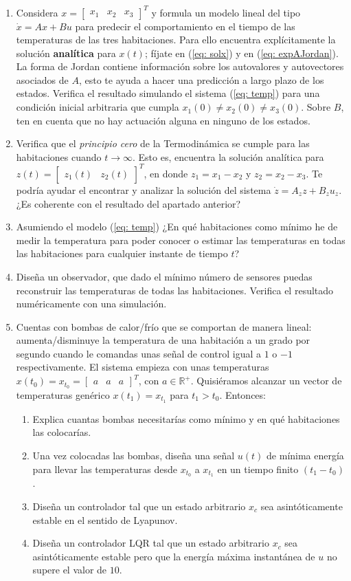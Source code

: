 \begin{enumerate}
	\item Considera $x = \begin{bmatrix}x_1 & x_2 & x_3\end{bmatrix}^T$ y formula un modelo lineal del tipo $\dot x = Ax + Bu$ para predecir el comportamiento en el tiempo de las temperaturas de las tres habitaciones. Para ello encuentra explícitamente la solución \textbf{analítica} para $x(t)$; fíjate en (\ref{eq: solx}) y en (\ref{eq: expAJordan}). La forma de Jordan contiene información sobre los autovalores y autovectores asociados de $A$, esto te ayuda a hacer una predicción a largo plazo de los estados. Verifica el resultado simulando el sistema (\ref{eq: temp}) para una condición inicial arbitraria que cumpla $x_1(0) \neq x_2(0) \neq x_3(0)$. Sobre $B$, ten en cuenta que no hay actuación alguna en ninguno de los estados.
	\item Verifica que el \emph{principio cero} de la Termodinámica se cumple para las habitaciones cuando $t\to\infty$. Esto es, encuentra la solución analítica para $z(t) = \begin{bmatrix}z_1(t) & z_2(t)\end{bmatrix}^T$, en donde $z_1 = x_1-x_2$ y $z_2 = x_2-x_3$. Te podría ayudar el encontrar y analizar la solución del sistema $\dot z = A_z z + B_z u_z$. ¿Es coherente con el resultado del apartado anterior?
	\item Asumiendo el modelo (\ref{eq: temp}) ¿En qué habitaciones como mínimo he de medir la temperatura para poder conocer o estimar las temperaturas en todas las habitaciones para cualquier instante de tiempo $t$?
	\item Diseña un observador, que dado el mínimo número de sensores puedas reconstruir las temperaturas de todas las habitaciones. Verifica el resultado numéricamente con una simulación.
		\item Cuentas con bombas de calor/frío que se comportan de manera lineal: aumenta/disminuye la temperatura de una habitación a un grado por segundo cuando le comandas unas señal de control igual a $1$ o $-1$ respectivamente. El sistema empieza con unas temperaturas $x(t_0) = x_{t_0} = \begin{bmatrix}a & a & a\end{bmatrix}^T$, con $a \in\mathbb{R}^+$. Quisiéramos alcanzar un vector de temperaturas genérico $x(t_1) = x_{t_1}$ para $t_1 > t_0$. Entonces:
\begin{enumerate}
\item Explica cuantas bombas necesitarías como mínimo y en qué habitaciones las colocarías.
\item Una vez colocadas las bombas, diseña una señal $u(t)$ de mínima energía para llevar las temperaturas desde $x_{t_0}$ a $x_{t_1}$ en un tiempo finito $(t_1-t_0)$.
\item Diseña un controlador tal que un estado arbitrario $x_c$ sea asintóticamente estable en el sentido de Lyapunov.
\item Diseña un controlador LQR tal que un estado arbitrario $x_c$ sea asintóticamente estable pero que la energía máxima instantánea de $u$ no supere el valor de $10$.
\end{enumerate}
\end{enumerate}
